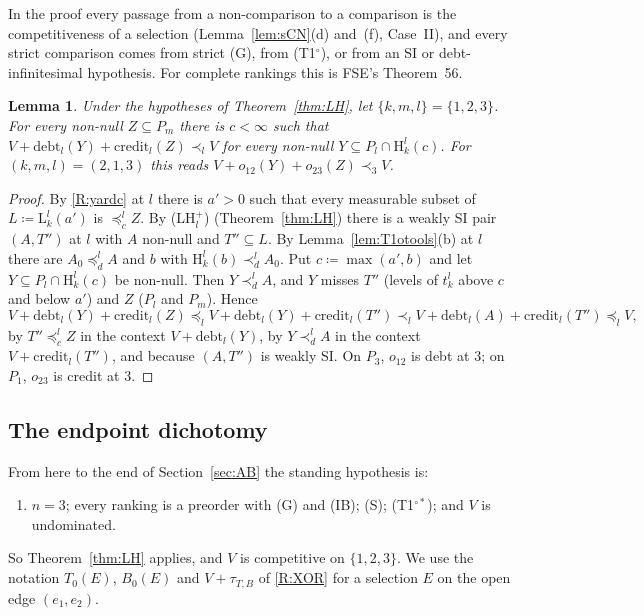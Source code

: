 \documentclass[11pt]{article}
\newtheorem{lemma}[theorem]{Lemma}
\theoremstyle{definition}\newtheorem{definition}[theorem]{Definition}
\theoremstyle{remark}\newtheorem{remark}[theorem]{Remark}
\newcommand{\debt}{\mathrm{debt}}
\newcommand{\cred}{\mathrm{credit}}
\newcommand{\Lo}[3]{\mathrm L^{#1}_{#2}(#3)}
\newcommand{\Hi}[3]{\mathrm H^{#1}_{#2}(#3)}
\newcommand{\To}{\textup{(T1$^\circ$)}}
\newcommand{\Tos}{\textup{(T1$^{\circ*}$)}}
\begin{document}
In the proof every passage from a non-comparison to a comparison is the
competitiveness of a selection (Lemma~\ref{lem:sCN}(d) and~(f), Case~II),
and every strict comparison comes from strict (G), from \To{}, or from an
SI or debt-infinitesimal hypothesis. For complete rankings this is FSE's
Theorem~56.

\begin{lemma}\label{lem:exchange}
Under the hypotheses of Theorem~\ref{thm:LH}, let $\{k,m,l\}=\{1,2,3\}$.
For every non-null $Z\subseteq P_m$ there is $c<\infty$ such that
$V+\debt_l(Y)+\cred_l(Z)\prec_lV$ for every non-null $Y\subseteq
P_l\cap\Hi lkc$. For $(k,m,l)=(2,1,3)$ this reads
$V+o_{12}(Y)+o_{23}(Z)\prec_3V$.
\end{lemma}
\begin{proof}
By \ref{R:yardc} at $l$ there is $a'>0$ such that every measurable subset
of $L\coloneqq\Lo lk{a'}$ is $\preceq^l_cZ$. By (LH$^+_l$)
(Theorem~\ref{thm:LH}) there is a weakly SI pair $(A,T'')$ at $l$ with $A$
non-null and $T''\subseteq L$. By Lemma~\ref{lem:T1otools}(b) at $l$ there
are $A_0\preceq^l_dA$ and $b$ with $\Hi lkb\prec^l_dA_0$. Put
$c\coloneqq\max(a',b)$ and let $Y\subseteq P_l\cap\Hi lkc$ be non-null. Then
$Y\prec^l_dA$, and $Y$ misses $T''$ (levels of $t^l_k$ above $c$ and below
$a'$) and $Z$ ($P_l$ and $P_m$). Hence
\[
 V+\debt_l(Y)+\cred_l(Z)\preceq_lV+\debt_l(Y)+\cred_l(T'')\prec_l
 V+\debt_l(A)+\cred_l(T'')\preceq_lV,
\]
by $T''\preceq^l_cZ$ in the context $V+\debt_l(Y)$, by $Y\prec^l_dA$ in the
context $V+\cred_l(T'')$, and because $(A,T'')$ is weakly SI. On $P_3$,
$o_{12}$ is debt at $3$; on $P_1$, $o_{23}$ is credit at $3$.
\end{proof}

\subsection{The endpoint dichotomy}\label{sec:dichotomy}

From here to the end of Section~\ref{sec:AB} the standing hypothesis is:
\begin{enumerate}[label=(A),leftmargin=*]
\item $n=3$; every ranking is a preorder with (G) and (IB); (S); \Tos; and
$V$ is undominated.
\end{enumerate}
So Theorem~\ref{thm:LH} applies, and $V$ is competitive on $\{1,2,3\}$. We
use the notation $T_0(E)$, $B_0(E)$ and $V+\tau_{T,B}$ of \ref{R:XOR} for a
selection $E$ on the open edge $(e_1,e_2)$.
\end{document}
